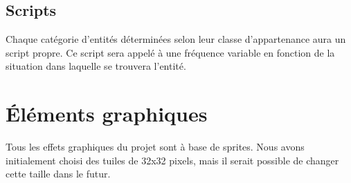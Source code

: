 \documentclass[a4paper]{memoir}
\begin{document}
			\subsection{Scripts}
				Chaque catégorie d'entités déterminées selon leur classe d'appartenance aura un script propre. Ce script sera appelé à une fréquence variable en fonction de la situation dans laquelle se trouvera l'entité.
			
		\section{\'Eléments graphiques}
			Tous les effets graphiques du projet sont à base de sprites. Nous avons initialement choisi des tuiles de 32x32 pixels, mais il serait possible de changer cette taille dans le futur.\\
\end{document}
